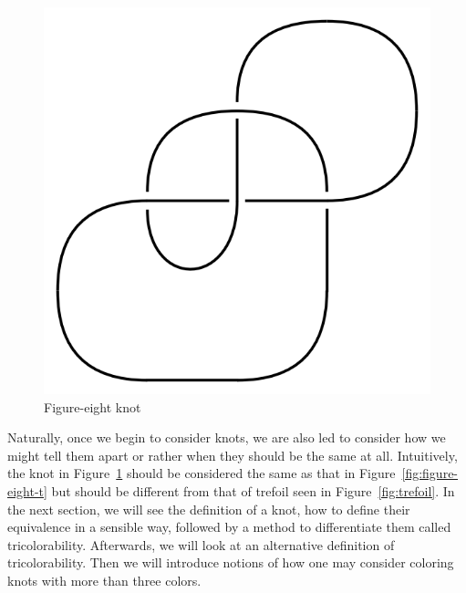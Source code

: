 \documentclass[12pt]{amsart}
\theoremstyle{definition}
\theoremstyle{remark}
\numberwithin{equation}{section}
\newcommand{\ds}{.3}
\begin{document}
\begin{figure}
  \includegraphics[scale=\ds]{figure-eight}
  \caption{Figure-eight knot}
  \label{fig:figure-eight}
\end{figure}

Naturally, once we begin to consider knots, we are also led to consider
how we might tell them apart or rather when they should be the same
at all. Intuitively, the knot in Figure~\ref{fig:figure-eight} should
be considered the same as that in Figure~\ref{fig:figure-eight-t} but should be
different from that of trefoil seen in Figure~\ref{fig:trefoil}. In
the next section, we will see the definition of a knot, how to define their
equivalence in a sensible way, followed by a method to differentiate them
called tricolorability. Afterwards, we will look at an alternative definition
of tricolorability. Then we will introduce notions of how one may consider
coloring knots with more than three colors.
\end{document}
